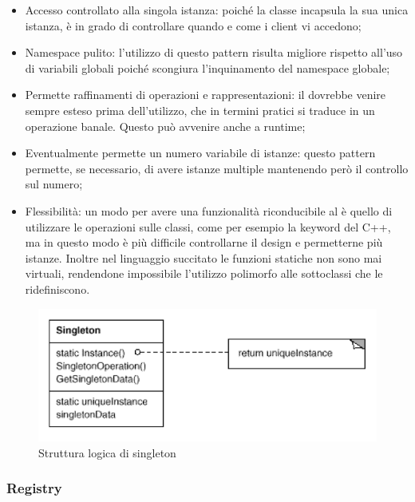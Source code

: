 \begin{itemize}

	\item Accesso controllato alla singola istanza: poiché la classe  incapsula la sua unica istanza, è in grado di controllare quando e come i client vi accedono;
	\item Namespace pulito: l'utilizzo di questo pattern risulta migliore rispetto all'uso di variabili globali poiché scongiura l'inquinamento del namespace globale;
	\item Permette raffinamenti di operazioni e rappresentazioni: il  dovrebbe venire sempre esteso prima dell'utilizzo, che in termini pratici si traduce in un operazione banale. Questo può avvenire anche a runtime;
	\item Eventualmente permette un numero variabile di istanze: questo pattern permette, se necessario, di avere istanze multiple mantenendo però il controllo sul numero;
	\item Flessibilità: un modo per avere una funzionalità riconducibile al  è quello di utilizzare le operazioni sulle classi, come per esempio la keyword  del C++, ma in questo modo è più difficile controllarne il design e permetterne più istanze. Inoltre nel linguaggio succitato le funzioni statiche non sono mai virtuali, rendendone impossibile l'utilizzo polimorfo alle sottoclassi che le ridefiniscono.
	
\end{itemize}

\begin{figure}[H]
\centering \includegraphics[width=\textwidth]{patterns/Singleton.png}
\caption{Struttura logica di singleton}
\label{fig:singleton}
\end{figure}

\subsubsection{Registry} %

